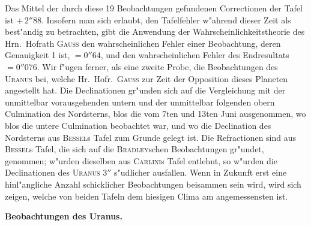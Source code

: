 \documentclass[12pt,a4paper]{article}
\begin{document}
Das Mittel der durch diese 19 Beobachtungen gefundenen Correctionen der Tafel ist $+\,2''88$. Insofern
man sich erlaubt, den Tafelfehler w"ahrend dieser Zeit als best"andig zu betrachten, gibt die Anwendung
der Wahrscheinlichkeitstheorie des Hrn.~Hofrath \textsc{Gauss} den wahrscheinlichen Fehler einer Beobachtung,
deren Genauigkeit 1 ist, $= 0''64$, und den wahrscheinlichen Fehler des Endresultats $= 0''076$. Wir f"ugen
ferner, als eine zweite Probe, die Beobachtungen des \textsc{Uranus} bei, welche Hr.~Hofr.~\textsc{Gauss} zur Zeit der
Opposition dieses Planeten angestellt hat. Die Declinationen gr"unden sich auf die Vergleichung mit der
unmittelbar vorausgehenden untern und der unmittelbar folgenden obern Culmination des Nordsterns, blos
die vom 7ten und 13ten Juni ausgenommen, wo blos die untere Culmination beobachtet war, und wo die
Declination des Nordsterns aus \textsc{Bessel}s Tafel zum Grunde gelegt ist. Die Refractionen sind aus
\textsc{Bessel}s Tafel, die sich auf die \textsc{Bradley}schen Beobachtungen gr"undet, genommen; w"urden dieselben
aus \textsc{Carlini}s Tafel entlehnt, so w"urden die Declinationen des \textsc{Uranus} $3''$ s"udlicher ausfallen.
Wenn in Zukunft erst eine hinl"angliche Anzahl schicklicher Beobachtungen beisammen sein wird, wird sich
zeigen, welche von beiden Tafeln dem hiesigen Clima am angemessensten ist.

\newpage

\begin{center}
\textbf{Beobachtungen des Uranus.}
\end{center}
\end{document}
